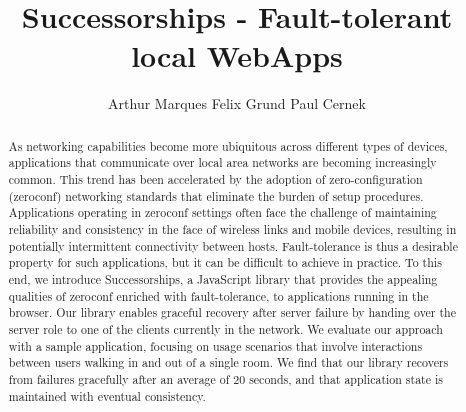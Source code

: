 \documentclass[sigconf]{acmart}
\title{Successorships - Fault-tolerant local WebApps}
\author{Arthur Marques \qquad Felix Grund \qquad Paul Cernek}
\affiliation{
    \institution{University of British Columbia}
    \city{Vancouver} 
    \state{BC} 
  }
\begin{document}
\begin{abstract}
As networking capabilities become more ubiquitous across different types of devices, applications that communicate over local area networks are becoming increasingly common.
This trend has been accelerated by the adoption of zero-configuration (zeroconf) networking standards that eliminate the burden of setup procedures.
Applications operating in zeroconf settings often face the challenge of maintaining reliability and consistency in the face of wireless links and mobile devices, resulting in potentially intermittent connectivity between hosts.
Fault-tolerance is thus a desirable property for such applications, but it can be difficult to achieve in practice.
To this end, we introduce Successorships, a JavaScript library that provides the appealing qualities of zeroconf enriched with fault-tolerance, to applications running in the browser.
Our library enables graceful recovery after server failure by handing over the server role to one of the clients currently in the network.
We evaluate our approach with a sample application, focusing on usage scenarios that involve interactions between users walking in and out of a single room. 
We find that our library recovers from failures gracefully after an average of 20 seconds, and that application state is maintained with eventual consistency.
\end{abstract}

\maketitle



















\end{document}
